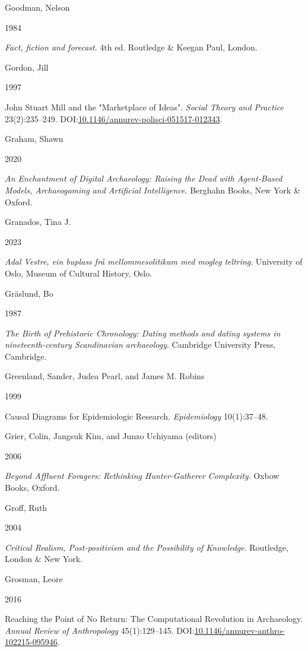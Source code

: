 \documentclass[
  12pt,
  a4paper,
  oneside]{book}
\newlength{\cslhangindent}
\newlength{\csllabelwidth}
\newlength{\cslentryspacingunit} %
\newenvironment{CSLReferences}[2] %
 {%
  \setlength{\parindent}{0pt}
  \ifodd #1
  \let\oldpar\par
  \def\par{\hangindent=\cslhangindent\oldpar}
  \fi
  \setlength{\parskip}{#2\cslentryspacingunit}
 }%
 {}
\newcommand{\CSLBlock}[1]{#1\hfill\break}
\newcommand{\CSLLeftMargin}[1]{\parbox[t]{\csllabelwidth}{#1}}
\newcommand{\CSLRightInline}[1]{\parbox[t]{\linewidth - \csllabelwidth}{#1}\break}
\begin{document}
\begin{CSLReferences}{0}{0}
\leavevmode{}%
\CSLBlock{Goodman, Nelson}
\CSLLeftMargin{ 1984}%
\CSLRightInline{\emph{{Fact, fiction and forecast}}. 4th ed. Routledge \& Keegan Paul, London.}

\leavevmode{}%
\CSLBlock{Gordon, Jill}
\CSLLeftMargin{ 1997}%
\CSLRightInline{{John Stuart Mill and the "Marketplace of Ideas"}. \emph{Social Theory and Practice} 23(2):235--249. DOI:\href{https://doi.org/10.1146/annurev-polisci-051517-012343}{10.1146/annurev-polisci-051517-012343}.}

\leavevmode{}%
\CSLBlock{Graham, Shawn}
\CSLLeftMargin{ 2020}%
\CSLRightInline{\emph{{An Enchantment of Digital Archaeology: Raising the Dead with Agent-Based Models, Archaeogaming and Artificial Intelligence}}. Berghahn Books, New York \& Oxford.}

\leavevmode{}%
\CSLBlock{Granados, Tina J.}
\CSLLeftMargin{ 2023}%
\CSLRightInline{\emph{{Adal Vestre, ein buplass frå mellommesolitikum med mogleg teltring}}. University of Oslo, Museum of Cultural History, Oslo.}

\leavevmode{}%
\CSLBlock{Gräslund, Bo}
\CSLLeftMargin{ 1987}%
\CSLRightInline{\emph{{The Birth of Prehistoric Chronology: Dating methods and dating systems in nineteenth-century Scandinavian archaeology}}. Cambridge University Press, Cambridge.}

\leavevmode{}%
\CSLBlock{Greenland, Sander, Judea Pearl, and James M. Robins}
\CSLLeftMargin{ 1999}%
\CSLRightInline{{Causal Diagrams for Epidemiologic Research}. \emph{Epidemiology} 10(1):37--48.}

\leavevmode{}%
\CSLBlock{Grier, Colin, Jangsuk Kim, and Junzo Uchiyama (editors)}
\CSLLeftMargin{ 2006}%
\CSLRightInline{\emph{{Beyond Affluent Foragers: Rethinking Hunter-Gatherer Complexity}}. Oxbow Books, Oxford.}

\leavevmode{}%
\CSLBlock{Groff, Ruth}
\CSLLeftMargin{ 2004}%
\CSLRightInline{\emph{{Critical Realism, Post-positivism and the Possibility of Knowledge}}. Routledge, London \& New York.}

\leavevmode{}%
\CSLBlock{Grosman, Leore}
\CSLLeftMargin{ 2016}%
\CSLRightInline{{Reaching the Point of No Return: The Computational Revolution in Archaeology}. \emph{Annual Review of Anthropology} 45(1):129--145. DOI:\href{https://doi.org/10.1146/annurev-anthro-102215-095946}{10.1146/annurev-anthro-102215-095946}.}


\end{CSLReferences}
\end{document}
